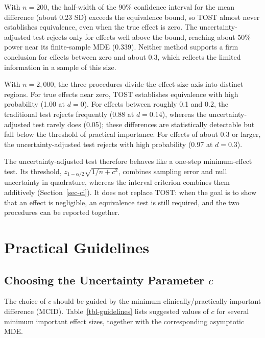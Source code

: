 \documentclass[
  11pt,
  letterpaper,
]{article}
\begin{document}
With \(n = 200\), the half-width of the 90\% confidence interval for the
mean difference (about 0.23 SD) exceeds the equivalence bound, so TOST
almost never establishes equivalence, even when the true effect is zero.
The uncertainty-adjusted test rejects only for effects well above the
bound, reaching about 50\% power near its finite-sample MDE (0.339).
Neither method supports a firm conclusion for effects between zero and
about 0.3, which reflects the limited information in a sample of this
size.

With \(n = 2{,}000\), the three procedures divide the effect-size axis
into distinct regions. For true effects near zero, TOST establishes
equivalence with high probability (1.00 at \(d = 0\)). For effects
between roughly 0.1 and 0.2, the traditional test rejects frequently
(0.88 at \(d = 0.14\)), whereas the uncertainty-adjusted test rarely
does (0.05); these differences are statistically detectable but fall
below the threshold of practical importance. For effects of about 0.3 or
larger, the uncertainty-adjusted test rejects with high probability
(0.97 at \(d = 0.3\)).

The uncertainty-adjusted test therefore behaves like a one-step
minimum-effect test. Its threshold, \(z_{1-\alpha/2}\sqrt{1/n + c^2}\),
combines sampling error and null uncertainty in quadrature, whereas the
interval criterion combines them additively (Section~\ref{sec-ci}). It
does not replace TOST: when the goal is to show that an effect is
negligible, an equivalence test is still required, and the two
procedures can be reported together.

\section{Practical Guidelines}\label{sec-guidelines}

\subsection{\texorpdfstring{Choosing the Uncertainty Parameter
\(c\)}{Choosing the Uncertainty Parameter c}}\label{choosing-the-uncertainty-parameter-c}

The choice of \(c\) should be guided by the minimum
clinically/practically important difference (MCID).
Table~\ref{tbl-guidelines} lists suggested values of \(c\) for several
minimum important effect sizes, together with the corresponding
asymptotic MDE.
\end{document}
